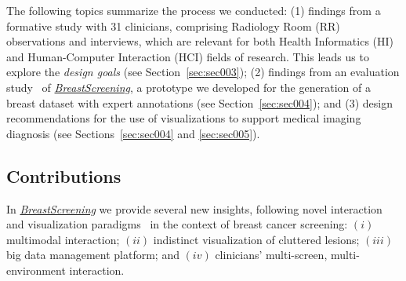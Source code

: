 The following topics summarize the process we conducted:
(1) findings from a formative study with 31 clinicians, comprising Radiology Room (RR) observations and interviews, which are relevant for both Health Informatics (HI) and Human-Computer Interaction (HCI) fields of research.
This leads us to explore the {\it design goals} (see Section~\ref{sec:sec003});
(2) findings from an evaluation study~\cite{https://doi.org/10.13140/rg.2.2.16566.14403/1} of \href{https://breastscreening.github.io/}{{\it BreastScreening}}, a prototype we developed for the generation of a breast dataset with expert annotations (see Section~\ref{sec:sec004}); and
(3) design recommendations for the use of visualizations to support medical imaging diagnosis (see Sections~\ref{sec:sec004} and \ref{sec:sec005}).

\subsection{Contributions}

In \href{https://breastscreening.github.io/}{{\it BreastScreening}} we provide several new insights, following novel interaction and visualization paradigms~\cite{PAULO2019103316} in the context of breast cancer screening:
$(i)$ multimodal interaction;
$(ii)$ indistinct visualization of cluttered lesions;
$(iii)$ big data management platform; and
$(iv)$ clinicians' multi-screen, multi-environment interaction.